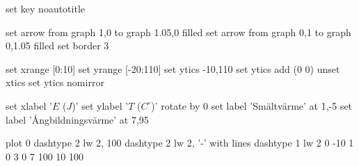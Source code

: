 
\begin{gnuplot}[terminal=epslatex, terminaloptions=mono]
	set key noautotitle

	set arrow from graph 1,0 to graph 1.05,0 filled
	set arrow from graph 0,1 to graph 0,1.05 filled
	set border 3

	set xrange [0:10]
	set yrange [-20:110]
	set ytics -10,110
	set ytics add (0 0)
	unset xtics
	set ytics nomirror

	set xlabel '$E$ ($J$)'
	set ylabel '$T$ ($C^{\circ}$)' rotate by 0
	set label 'Smältvärme' at 1,-5
	set label 'Ångbildningsvärme' at 7,95

	plot 0 dashtype 2 lw 2, 100 dashtype 2 lw 2, '-' with lines dashtype 1 lw 2
	0	-10
	1	0
	3	0
	7	100
	10	100
\end{gnuplot}
